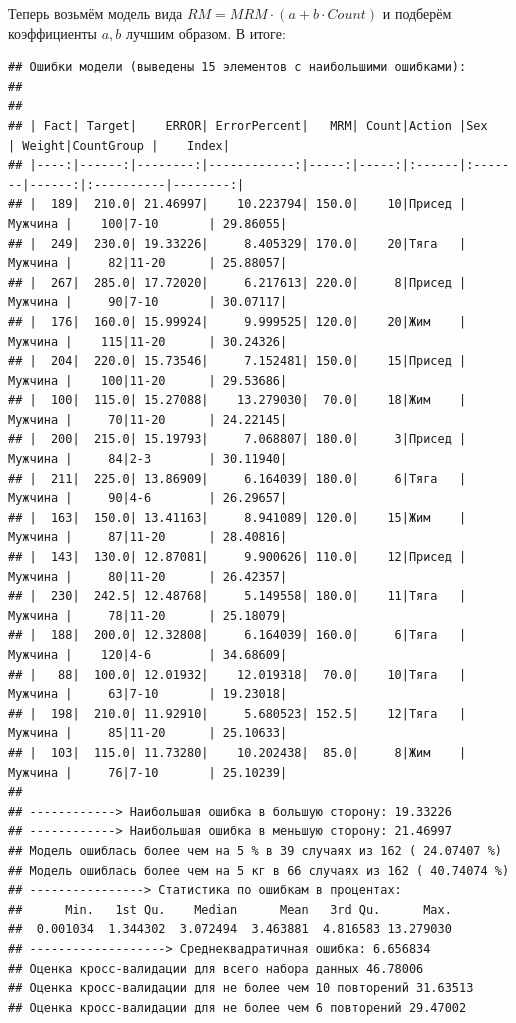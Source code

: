 \documentclass[
]{article}
\begin{document}
Теперь возьмём модель вида \(RM=MRM \cdot(a+b \cdot Count)\) и подберём
коэффициенты \(a,b\) лучшим образом. В итоге:

\begin{verbatim}
## Ошибки модели (выведены 15 элементов с наибольшими ошибками): 
## 
## 
## | Fact| Target|    ERROR| ErrorPercent|   MRM| Count|Action |Sex     | Weight|CountGroup |    Index|
## |----:|------:|--------:|------------:|-----:|-----:|:------|:-------|------:|:----------|--------:|
## |  189|  210.0| 21.46997|    10.223794| 150.0|    10|Присед |Мужчина |    100|7-10       | 29.86055|
## |  249|  230.0| 19.33226|     8.405329| 170.0|    20|Тяга   |Мужчина |     82|11-20      | 25.88057|
## |  267|  285.0| 17.72020|     6.217613| 220.0|     8|Присед |Мужчина |     90|7-10       | 30.07117|
## |  176|  160.0| 15.99924|     9.999525| 120.0|    20|Жим    |Мужчина |    115|11-20      | 30.24326|
## |  204|  220.0| 15.73546|     7.152481| 150.0|    15|Присед |Мужчина |    100|11-20      | 29.53686|
## |  100|  115.0| 15.27088|    13.279030|  70.0|    18|Жим    |Мужчина |     70|11-20      | 24.22145|
## |  200|  215.0| 15.19793|     7.068807| 180.0|     3|Присед |Мужчина |     84|2-3        | 30.11940|
## |  211|  225.0| 13.86909|     6.164039| 180.0|     6|Тяга   |Мужчина |     90|4-6        | 26.29657|
## |  163|  150.0| 13.41163|     8.941089| 120.0|    15|Жим    |Мужчина |     87|11-20      | 28.40816|
## |  143|  130.0| 12.87081|     9.900626| 110.0|    12|Присед |Мужчина |     80|11-20      | 26.42357|
## |  230|  242.5| 12.48768|     5.149558| 180.0|    11|Тяга   |Мужчина |     78|11-20      | 25.18079|
## |  188|  200.0| 12.32808|     6.164039| 160.0|     6|Тяга   |Мужчина |    120|4-6        | 34.68609|
## |   88|  100.0| 12.01932|    12.019318|  70.0|    10|Тяга   |Мужчина |     63|7-10       | 19.23018|
## |  198|  210.0| 11.92910|     5.680523| 152.5|    12|Тяга   |Мужчина |     85|11-20      | 25.10633|
## |  103|  115.0| 11.73280|    10.202438|  85.0|     8|Жим    |Мужчина |     76|7-10       | 25.10239|
## 
## ------------> Наибольшая ошибка в большую сторону: 19.33226 
## ------------> Наибольшая ошибка в меньшую сторону: 21.46997 
## Модель ошиблась более чем на 5 % в 39 случаях из 162 ( 24.07407 %)
## Модель ошиблась более чем на 5 кг в 66 случаях из 162 ( 40.74074 %)
## ----------------> Статистика по ошибкам в процентах:
##      Min.   1st Qu.    Median      Mean   3rd Qu.      Max. 
##  0.001034  1.344302  3.072494  3.463881  4.816583 13.279030 
## -------------------> Среднеквадратичная ошибка: 6.656834 
## Оценка кросс-валидации для всего набора данных 46.78006 
## Оценка кросс-валидации для не более чем 10 повторений 31.63513 
## Оценка кросс-валидации для не более чем 6 повторений 29.47002
\end{verbatim}
\end{document}
